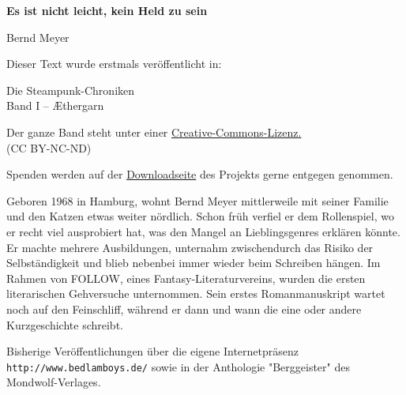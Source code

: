 \usepackage[ngerman]{babel}
\usepackage[T1]{fontenc}
\usepackage{textcomp}



\renewcommand*{\tb}{\begin{center}* \quad * \quad *\end{center}}

\newcommand\bigpar\medskip


\raggedbottom
\begin{center}
\textbf{\huge\textsf{Es ist nicht leicht, kein Held zu sein}}

\bigskip

Bernd Meyer
\end{center}

\bigskip

\begin{flushleft}
Dieser Text wurde erstmals veröffentlicht in:
\begin{center}
Die Steampunk-Chroniken\\
Band I -- Æthergarn
\end{center}

\bigskip

Der ganze Band steht unter einer
\href{http://creativecommons.org/licenses/by-nc-nd/2.0/de/}{Creative-Commons-Lizenz.} \\
(CC BY-NC-ND)

\bigskip

Spenden werden auf der
\href{http://steampunk-chroniken.de/download}{Downloadseite}
des Projekts gerne entgegen genommen.

\vfill

Geboren 1968 in Hamburg, wohnt Bernd Meyer mittlerweile mit seiner Familie
und den Katzen etwas weiter nördlich. Schon früh verfiel er dem
Rollenspiel, wo er recht viel ausprobiert hat, was den Mangel an
Lieblingsgenres erklären könnte. Er machte mehrere Ausbildungen,
unternahm zwischendurch das Risiko der Selbständigkeit und blieb
nebenbei immer wieder beim Schreiben hängen. Im Rahmen von FOLLOW,
eines Fantasy-Literaturvereins, wurden die ersten literarischen
Gehversuche unternommen. Sein erstes Romanmanuskript wartet noch
auf den Feinschliff, während er dann und wann die eine oder andere
Kurzgeschichte schreibt.

\bigpar

Bisherige Veröffentlichungen über die eigene Internetpräsenz
\texttt{http://www.bedlamboys.de/} sowie in
der Anthologie "Berggeister" des Mondwolf-Verlages.
\end{flushleft}

